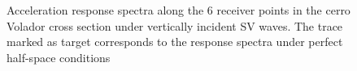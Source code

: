 \documentclass[11pt,letterpaper]{article}
\begin{document}
\begin{figure}[H]
	\center
	\caption{\small Acceleration response spectra along the 6 receiver points in the cerro Volador cross section under vertically incident SV waves. The trace marked as target corresponds to the response spectra under perfect half-space conditions}
 \label{fig:SaptosVolEWSV_fisica}
\end{figure}
\end{document}
